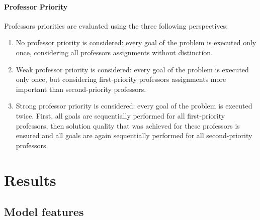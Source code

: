 \paragraph{Professor Priority}
Professors priorities are evaluated using the three following perspectives:
\begin{enumerate}
\item No professor priority is considered: every goal of the problem is executed only once, considering all professors assignments without distinction.
\item Weak professor priority is considered: every goal of the problem is executed only once, but considering first-priority professors assignments more important than second-priority professors.
\item Strong professor priority is considered: every goal of the problem is executed twice. First, all goals are sequentially performed for all first-priority professors, then solution quality that was achieved for these professors is ensured and all goals are again sequentially performed for all second-priority professors.
\end{enumerate}

%
%
%
%

\section{Results}

\subsection{Model features}

